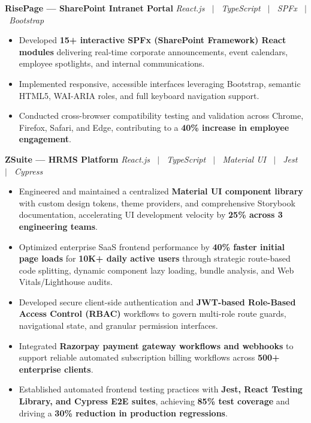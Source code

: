 \documentclass[letterpaper,10pt]{article}
\newcommand{\resumeProject}[2]{%
  \vspace{2pt}%
  \textbf{#1} \hfill \textit{#2}\\[-6pt]
}
\begin{document}
\resumeProject
  {RisePage --- SharePoint Intranet Portal}{React.js \ $|$ \ TypeScript \ $|$ \ SPFx \ $|$ \ Bootstrap}
\begin{itemize}
  \item Developed \textbf{15+ interactive SPFx (SharePoint Framework) React modules} delivering real-time corporate announcements, event calendars, employee spotlights, and internal communications.
  \item Implemented responsive, accessible interfaces leveraging Bootstrap, semantic HTML5, WAI-ARIA roles, and full keyboard navigation support.
  \item Conducted cross-browser compatibility testing and validation across Chrome, Firefox, Safari, and Edge, contributing to a \textbf{40\% increase in employee engagement}.
\end{itemize}
\vspace{0.2cm}
\resumeProject
  {ZSuite --- HRMS Platform}{React.js \ $|$ \ TypeScript \ $|$ \ Material UI \ $|$ \ Jest \ $|$ \ Cypress}
\begin{itemize}
  \item Engineered and maintained a centralized \textbf{Material UI component library} with custom design tokens, theme providers, and comprehensive Storybook documentation, accelerating UI development velocity by \textbf{25\% across 3 engineering teams}.
  \item Optimized enterprise SaaS frontend performance by \textbf{40\% faster initial page loads} for \textbf{10K+ daily active users} through strategic route-based code splitting, dynamic component lazy loading, bundle analysis, and Web Vitals/Lighthouse audits.
  \item Developed secure client-side authentication and \textbf{JWT-based Role-Based Access Control (RBAC)} workflows to govern multi-role route guards, navigational state, and granular permission interfaces.
  \item Integrated \textbf{Razorpay payment gateway workflows and webhooks} to support reliable automated subscription billing workflows across \textbf{500+ enterprise clients}.
  \item Established automated frontend testing practices with \textbf{Jest, React Testing Library, and Cypress E2E suites}, achieving \textbf{85\% test coverage} and driving a \textbf{30\% reduction in production regressions}.
\end{itemize}

\end{document}
